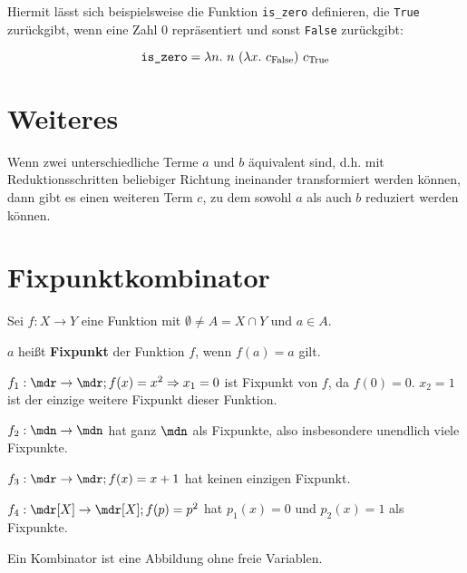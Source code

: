Hiermit lässt sich beispielsweise die Funktion \texttt{is\_zero} definieren, die
\texttt{True} zurückgibt, wenn eine Zahl $0$ repräsentiert und sonst \texttt{False}
zurückgibt:

\[ \text{\texttt{is\_zero}} = \lambda n.\ n\ (\lambda x.\ c_{\text{False}})\ c_{\text{True}}\]

\section{Weiteres}
\begin{satz}
    Wenn zwei unterschiedliche Terme $a$ und $b$ äquivalent sind, d.h. mit Reduktionsschritten beliebiger Richtung ineinander transformiert werden können, dann gibt es einen weiteren Term $c$, zu dem sowohl $a$ als auch $b$ reduziert werden können.
\end{satz}

\section{Fixpunktkombinator}
\begin{definition}[Fixpunkt]%
    Sei $f: X \rightarrow Y$ eine Funktion mit $\emptyset \neq A = X \cap Y$ und
    $a \in A$.

    $a$ heißt \textbf{Fixpunkt} der Funktion $f$, wenn $f(a) = a$ gilt.
\end{definition}

\begin{beispiel}[Fixpunkt]
    \begin{bspenum}
        \item $f_1: \mdr \rightarrow \mdr; f(x) = x^2 \Rightarrow x_1 = 0$ ist 
              Fixpunkt von $f$, da $f(0) = 0$. $x_2 = 1$ ist der einzige weitere
              Fixpunkt dieser Funktion.
        \item $f_2: \mdn \rightarrow \mdn$ hat ganz $\mdn$ als Fixpunkte, also
              insbesondere unendlich viele Fixpunkte.
        \item $f_3: \mdr \rightarrow \mdr; f(x) = x+1$ hat keinen einzigen Fixpunkt.
        \item $f_4: \mdr[X] \rightarrow \mdr[X]; f(p) = p^2$ hat $p_1(x) = 0$ und
              $p_2(x)=1$ als Fixpunkte.
    \end{bspenum}
\end{beispiel}

\begin{definition}[Kombinator]%
    Ein Kombinator ist eine Abbildung ohne freie Variablen.
\end{definition}

